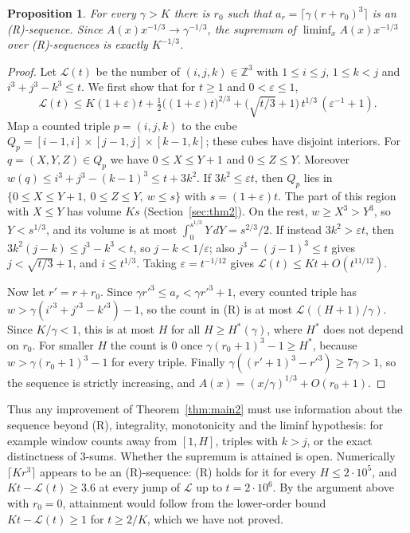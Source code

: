 \documentclass[11pt]{amsart}
\newtheorem{proposition}{Proposition}[section]
\theoremstyle{remark}
\newcommand{\Z}{\mathbb{Z}}
\begin{document}
\begin{proposition}\label{prop:sharp}
For every $\gamma>K$ there is $r_0$ such that $a_r=\lceil\gamma(r+r_0)^3\rceil$ is an (R)-sequence. Since $A(x)x^{-1/3}\to\gamma^{-1/3}$, the supremum of $\liminf_xA(x)x^{-1/3}$ over (R)-sequences is exactly $K^{-1/3}$.
\end{proposition}

\begin{proof}
Let $\mathcal L(t)$ be the number of $(i,j,k)\in\Z^3$ with $1\le i\le j$, $1\le k<j$ and $i^3+j^3-k^3\le t$. We first show that for $t\ge1$ and $0<\varepsilon\le1$,
\[
\mathcal L(t)\le K(1+\varepsilon)t+\tfrac12\bigl((1+\varepsilon)t\bigr)^{2/3}+\bigl(\sqrt{t/3}+1\bigr)\,t^{1/3}\,(\varepsilon^{-1}+1).
\]
Map a counted triple $p=(i,j,k)$ to the cube $Q_p=[i-1,i]\times[j-1,j]\times[k-1,k]$; these cubes have disjoint interiors. For $q=(X,Y,Z)\in Q_p$ we have $0\le X\le Y+1$ and $0\le Z\le Y$. Moreover $w(q)\le i^3+j^3-(k-1)^3\le t+3k^2$. If $3k^2\le\varepsilon t$, then $Q_p$ lies in $\{0\le X\le Y+1,\ 0\le Z\le Y,\ w\le s\}$ with $s=(1+\varepsilon)t$. The part of this region with $X\le Y$ has volume $Ks$ (Section~\ref{sec:thm2}). On the rest, $w\ge X^3>Y^3$, so $Y<s^{1/3}$, and its volume is at most $\int_0^{s^{1/3}}Y\,dY=s^{2/3}/2$. If instead $3k^2>\varepsilon t$, then $3k^2(j-k)\le j^3-k^3<t$, so $j-k<1/\varepsilon$; also $j^3-(j-1)^3\le t$ gives $j<\sqrt{t/3}+1$, and $i\le t^{1/3}$. Taking $\varepsilon=t^{-1/12}$ gives $\mathcal L(t)\le Kt+O(t^{11/12})$.

Now let $r'=r+r_0$. Since $\gamma r'^3\le a_r<\gamma r'^3+1$, every counted triple has $w>\gamma(i'^3+j'^3-k'^3)-1$, so the count in (R) is at most $\mathcal L((H+1)/\gamma)$. Since $K/\gamma<1$, this is at most $H$ for all $H\ge H^*(\gamma)$, where $H^*$ does not depend on $r_0$. For smaller $H$ the count is $0$ once $\gamma(r_0+1)^3-1\ge H^*$, because $w>\gamma(r_0+1)^3-1$ for every triple. Finally $\gamma((r'+1)^3-r'^3)\ge7\gamma>1$, so the sequence is strictly increasing, and $A(x)=(x/\gamma)^{1/3}+O(r_0+1)$.
\end{proof}

Thus any improvement of Theorem~\ref{thm:main2} must use information about the sequence beyond (R), integrality, monotonicity and the liminf hypothesis: for example window counts away from $[1,H]$, triples with $k>j$, or the exact distinctness of $3$-sums. Whether the supremum is attained is open. Numerically $\lceil Kr^3\rceil$ appears to be an (R)-sequence: (R) holds for it for every $H\le2\cdot10^5$, and $Kt-\mathcal L(t)\ge3.6$ at every jump of $\mathcal L$ up to $t=2\cdot10^6$. By the argument above with $r_0=0$, attainment would follow from the lower-order bound $Kt-\mathcal L(t)\ge1$ for $t\ge2/K$, which we have not proved.
\end{document}
